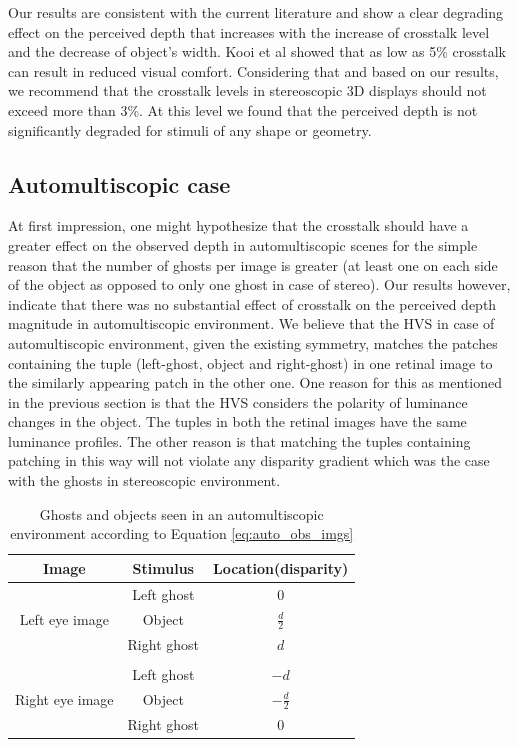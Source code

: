 Our results are consistent with the current literature and show a clear degrading effect on the perceived depth that increases with the increase of crosstalk level and the decrease of object's width. Kooi et al \cite{kooi2004visual} showed that as low as 5\% crosstalk can result in reduced visual comfort. Considering that and based on our results, we recommend that the crosstalk levels in stereoscopic 3D displays should not exceed more than 3\%. At this level we found that the perceived depth is not significantly degraded for stimuli of any shape or geometry.


\subsection{Automultiscopic case}

At first impression, one might hypothesize that the crosstalk should have a greater effect on the observed depth in automultiscopic scenes for the simple reason that the number of ghosts per image is greater (at least one on each side of the object as opposed to only one ghost in case of stereo). Our results however, indicate that there was no substantial effect of crosstalk on the perceived depth magnitude in automultiscopic environment. We believe that the HVS in case of automultiscopic environment, given the existing symmetry, matches the patches containing the tuple (left-ghost, object and right-ghost) in one retinal image to the similarly appearing patch in the other one. One reason for this as mentioned in the previous section is that the HVS considers the polarity of luminance changes in the object. The tuples in both the retinal images have the same luminance profiles. The other reason is that matching the tuples containing patching in this way will not violate any disparity gradient which was the case with the ghosts in stereoscopic environment.

\begin{table}[ht!]
  \begin{center}
    \caption{Ghosts and objects seen in an automultiscopic environment according to Equation \ref{eq:auto_obs_imgs}}
    \label{tab:ghost_obj_names}
    \begin{tabular}{ccc}
      \toprule
      Image & Stimulus  & Location(disparity)\\
      \midrule
                       & Left ghost & 0  \\
      Left eye image   & Object & $\frac{d}{2}$\\
                       & Right ghost & $d$\\
                       &             & \\
                       & Left ghost & $-d$  \\
      Right eye image  & Object & $-\frac{d}{2}$\\
                       & Right ghost & 0\\
      \bottomrule
    \end{tabular}
  \end{center}
\end{table}

